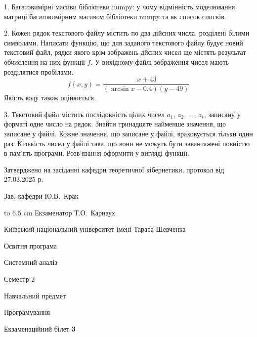 \documentclass[12pt, ukrainian]{article}
\begin{document}
{%
1. Багатовимірні масиви бібліотеки numpy: у чому відмінність моделювання матриці багатовимірним масивом бібліотеки numpy та як список списків.%
\par
\vspace{2mm}

2. Кожен рядок текстового файлу містить по два дійсних числа, розділені білими символами.
Написати функцію, що для заданого текстового файлу будує новий текстовий файл, рядки якого крім зображень дйсних чисел ще містять результат обчислення на них функції $f$. У вихідному файлі зображення чисел мають розділятися пробілами. 
$$f(x, y) =\frac{\ x + 43}{(\arcsin x - 0.4) (y - 49)}$$ 
Якість коду також оцінюється.

\par
\vspace{2mm}

3. Текстовий файл містить послідовність цілих чисел $a_1$, $a_2$, $\ldots$, $a_t$, записану у форматі одне число на рядок. Знайти тринадцяте найменше значення, що записане у файлі. Кожне значення, що записане у файлі, враховується тільки один раз. Кількість чисел у файлі така, що вони не можуть бути завантажені повністю в пам'ять програми. Розв'язання оформити у вигляді функції.

}
{\smallskip\smallskip \begin {scriptsize} Затверджено на засіданні кафедри теоретичної кібернетики, протокол   від   27.03.2025 р.\par\smallskip\smallskip\smallskip\smallskip
{\parbox {6.5 cm} {Зав. кафедри \dotfill Ю.В.~Крак}}\hspace {0.7cm} {\hbox to 6.5 cm { Екзаменатор \dotfill Т.О.~Карнаух}} \end{scriptsize}}
\newpage
{{\begin {scriptsize}\par
{ \center  Київський національний університет імені Тараса Шевченка \par}
{\parbox {5 cm}{Освітня програма \hfill}{\parbox {7 cm}{Системний аналіз\hfill}}\parbox {6 cm}{\hfill Семестр 2}}\par
{\parbox {5 cm} {Навчальний предмет \hfill}\parbox {7 cm}{Програмування \hfill}\parbox {6cm}{\hfill}\par}\vspace{-15pt} \end{scriptsize}}{\center Екзаменаційний білет \No \textbf { 3 }\par}}
\end{document}

